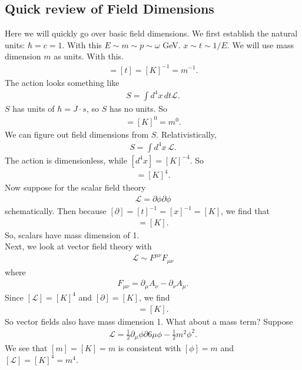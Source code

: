 \documentclass{book}
\theoremstyle{definition}
\newcommand{\p}{\partial}
\newcommand{\lag}{\mathcal{L}}
\newcommand{\f}[2]{\frac{#1}{#2}}
\begin{document}
\subsection{Quick review of Field Dimensions}
Here we will quickly go over basic field dimensions. We first establish the natural units: $\hbar = c = 1$. With this $E \sim m \sim p \sim \omega$ GeV. $x\sim t \sim 1/E$. We will use mass dimension $m$ as units. With this.
\begin{align}
[x] = [t] =  [K]^{-1} = m^{-1}.
\end{align} 
The action looks something like
\begin{align}
S = \int d^4x\, dt \lag.
\end{align}
$S$ has units of $\hbar = J\cdot s$, so $S$ has no units. So
\begin{align}
[S] = [K]^{0} = m^0.
\end{align}
We can figure out field dimensions from $S$. Relativistically,
\begin{align}
S = \int d^4x\,\lag.
\end{align}
The action is dimensionless, while $[d^4x] = [K]^{-4}$. So
\begin{align}
[\lag] = [K]^{4}.
\end{align}
Now suppose for the scalar field theory
\begin{align}
\lag = \p \phi \p \phi
\end{align}
schematically. Then because $[\p] = [t]^{-1} = [x]^{-1} = [K]$, we find that
\begin{align}
[\phi]= [K].
\end{align}
So, scalars have mass dimension of 1. \\

Next, we look at vector field theory with
\begin{align}
\lag \sim F^{\mu\nu}F_{\mu\nu}
\end{align}
where 
\begin{align}
F_{\mu\nu} = \p_\mu A_\nu - \p_\nu A_\mu.
\end{align}
Since $[\lag] = [K]^4$ and $[\p]= [K]$, we find
\begin{align}
[A_\mu] = [K].
\end{align}
So vector fields also have mass dimension 1. What about a mass term? Suppose
\begin{align}
\lag = \f{1}{2}\p_\mu \phi \p6\mu \phi- \f{1}{2}m^2 \phi^2.
\end{align}
We see that $[m] = [K] = m$ is consistent with $[\phi] = m$ and $[\lag] = [K]^4 = m^4$.\\
\end{document}
